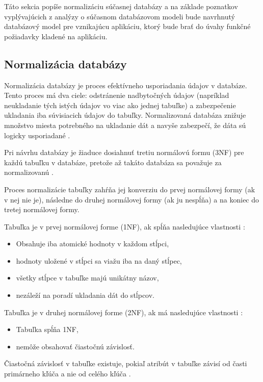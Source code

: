 Táto sekcia popíše normalizáciu súčasnej databázy a na základe poznatkov vyplývajúcich z analýzy o súčasnom databázovom modeli bude navrhnutý databázový model pre vznikajúcu aplikáciu, ktorý bude brať do úvahy funkčné požiadavky kladené na aplikáciu.

\subsection{Normalizácia databázy}
Normalizácia databázy je proces efektívneho usporiadania údajov v databáze. Tento proces má dva ciele: odstránenie nadbytočných údajov (napríklad neukladanie tých istých údajov vo viac ako jednej tabuľke) a zabezpečenie ukladania iba  súvisiacich údajov do tabuľky. Normalizovaná databáza znižuje množstvo miesta potrebného na ukladanie dát a navyše zabezpečí, že dáta sú logicky usporiadané \cite{co-je-normalizacia}.

Pri návrhu databázy je žiaduce dosiahnuť tretiu normálovú formu (3NF) pre každú tabuľku v databáze, pretože až takáto databáza sa považuje za normalizovanú \cite{normalizovana-tabulka}.

Proces normalizácie tabuľky zahŕňa jej konverziu do prvej normálovej formy (ak v nej nie je), následne do druhej normálovej formy (ak ju nespĺňa) a na koniec do tretej normálovej formy.

Tabuľka je v prvej normálovej forme (1NF), ak spĺňa nasledujúce vlastnosti \cite{typy-normalizacie}:
\begin{itemize}
	\item Obsahuje iba atomické hodnoty v každom stĺpci,
	\item hodnoty uložené v stĺpci sa viažu iba na daný stĺpec,
	\item všetky stĺpce v tabuľke majú unikátny názov,
	\item nezáleží na poradí ukladania dát do stĺpcov. 
\end{itemize}

Tabuľka je v druhej normálovej forme (2NF), ak má nasledujúce vlastnosti \cite{typy-normalizacie}:
\begin{itemize}
	\item Tabuľka spĺňa 1NF,
	\item nemôže obsahovať čiastočnú závislosť.
\end{itemize}

Čiastočná závislosť v tabuľke existuje, pokiaľ atribút v tabuľke závisí od časti primárneho kľúča a nie od celého kľúča \cite{ciastocna-zavislost}. 


